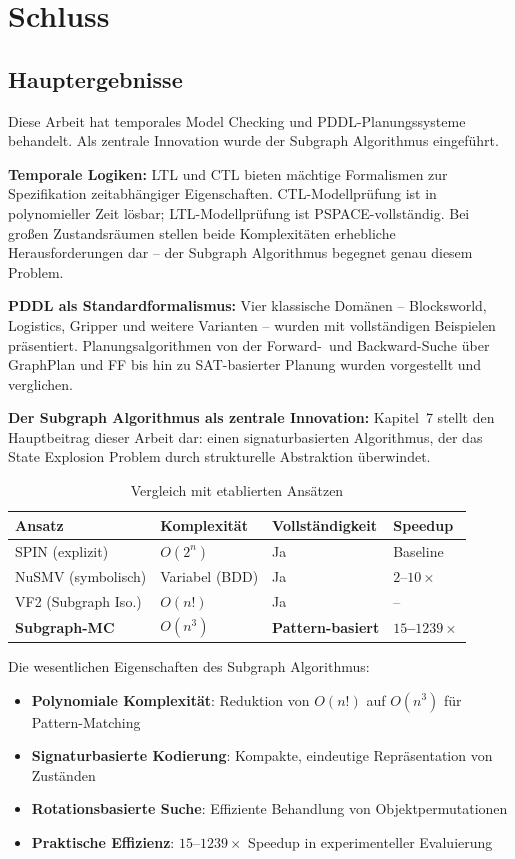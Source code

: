 ﻿\documentclass[a4paper,12pt]{article}
\theoremstyle{definition}
\begin{document}
\section{Schluss}

\subsection{Hauptergebnisse}

Diese Arbeit hat temporales Model Checking und PDDL-Planungssysteme behandelt. Als zentrale Innovation wurde der Subgraph Algorithmus eingeführt.

\textbf{Temporale Logiken:} LTL und CTL bieten mächtige Formalismen zur Spezifikation zeitabhängiger Eigenschaften. CTL-Modellprüfung ist in polynomieller Zeit lösbar; LTL-Modellprüfung ist PSPACE-vollständig. Bei großen Zustandsräumen stellen beide Komplexitäten erhebliche Herausforderungen dar -- der Subgraph Algorithmus begegnet genau diesem Problem.

\textbf{PDDL als Standardformalismus:} Vier klassische Domänen -- Blocksworld, Logistics, Gripper und weitere Varianten -- wurden mit vollständigen Beispielen präsentiert. Planungsalgorithmen von der Forward-~und Backward-Suche über GraphPlan und FF bis hin zu SAT-basierter Planung wurden vorgestellt und verglichen.

\textbf{Der Subgraph Algorithmus als zentrale Innovation:} Kapitel~7 stellt den Hauptbeitrag dieser Arbeit dar: einen signaturbasierten Algorithmus, der das State Explosion Problem durch strukturelle Abstraktion überwindet.

\begin{table}[h]
	\centering
	\caption{Vergleich mit etablierten Ansätzen}
	\label{tab:final_comparison}
	\begin{tabular}{llll}
		\toprule
		Ansatz & Komplexität & Vollständigkeit & Speedup \\
		\midrule
		SPIN (explizit) & $O(2^n)$ & Ja & Baseline \\
		NuSMV (symbolisch) & Variabel (BDD) & Ja & $2$--$10\times$ \\
		VF2 (Subgraph Iso.) & $O(n!)$ & Ja & -- \\
		\textbf{Subgraph-MC} & \textbf{$O(n^3)$} & \textbf{Pattern-basiert} & \textbf{$15$--$1239\times$} \\
		\bottomrule
	\end{tabular}
\end{table}

Die wesentlichen Eigenschaften des Subgraph Algorithmus:
\begin{itemize}
	\item[-] \textbf{Polynomiale Komplexität}: Reduktion von $O(n!)$ auf $O(n^3)$ für Pattern-Matching
	\item[-] \textbf{Signaturbasierte Kodierung}: Kompakte, eindeutige Repräsentation von Zuständen
	\item[-] \textbf{Rotationsbasierte Suche}: Effiziente Behandlung von Objektpermutationen
	\item[-] \textbf{Praktische Effizienz}: $15$--$1239\times$ Speedup in experimenteller Evaluierung
\end{itemize}
\end{document}
